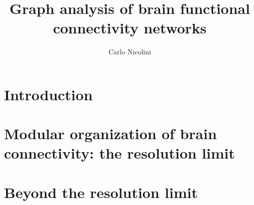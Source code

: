 
%

\title{Graph analysis of brain functional connectivity networks}
\author{Carlo Nicolini}

\newtheorem{obs}{Observation}
\newtheorem{props}{Proposition}



\maketitle
{}

\tableofcontents
\listoftodos

%

%

%


\chapter{Introduction}\label{chap:introduction}
	

\chapter{Modular organization of brain connectivity: the resolution limit}\label{chap:modularorganization}
	

\chapter{Beyond the resolution limit}\label{chap:beyondresolutionlimit}
	

